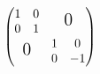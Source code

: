 \[  \begin{pmatrix}
\begin{matrix} 1&0\\0&1 \end{matrix}
& \text{\Large 0} \\
\text{\Large 0} &
\begin{matrix} 1&0\\0&-1 \end{matrix}
\end{pmatrix} \]
